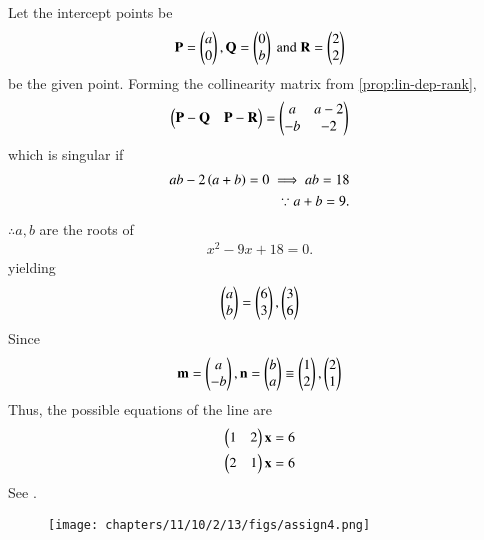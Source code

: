 Let  the intercept points be
\begin{align}
{\mathbf{P}}=\begin{pmatrix}
  a\\
  0\end{pmatrix}
 , {\mathbf{Q}}=\begin{pmatrix}
  0\\
  b\end{pmatrix}
  \text{ and }
   {\mathbf{R}}=\begin{pmatrix}
  2\\
  2\end{pmatrix}
\end{align}
be the given point.  
Forming the collinearity matrix from 
		\eqref{prop:lin-dep-rank},
\begin{align}
	\begin{pmatrix} \mathbf{P}-\mathbf{Q} &\mathbf{P}-\mathbf{R}\end{pmatrix} 
	=
	 \begin{pmatrix}
  a & a-2\\
  -b & -2
 \end{pmatrix}
\end{align}
which is singular if 
\begin{align}
 ab -2\left(a+b\right) = 0
 \implies ab = 18
		\label{eq:11/10/2/13-a+b}
		\\
\because  a + b = 9.
\end{align}
$\therefore a,b$
are the roots of
\begin{align}
	x^2 -9x +18 = 0.
\end{align}
yielding
\begin{align}
	\begin{pmatrix}a \\ b\end{pmatrix} = \begin{pmatrix}6 \\ 3\end{pmatrix}, \begin{pmatrix}3\\6\end{pmatrix}
\end{align}
Since 
\begin{align}
	\mathbf{m} = \begin{pmatrix}a \\ -b\end{pmatrix},
	\mathbf{n} = \begin{pmatrix}b \\ a\end{pmatrix} \equiv \begin{pmatrix}1 \\ 2\end{pmatrix}, \begin{pmatrix}2\\1\end{pmatrix}
\end{align}
Thus, the possible equations of the line are 
\begin{align}
\begin{pmatrix}1 & 2\end{pmatrix}\mathbf{x} = 6
	\\
	\begin{pmatrix}2&1\end{pmatrix}\mathbf{x} = 6
\end{align}
		See .
	\begin{figure}[H]
		\centering
 \texttt{[image: chapters/11/10/2/13/figs/assign4.png]}
		\caption{}
		\label{fig:11/10/2/13}
  	\end{figure}
